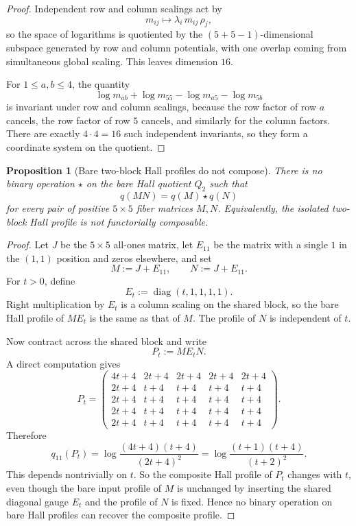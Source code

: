 \documentclass[11pt]{article}
\newtheorem{proposition}[theorem]{Proposition}
\theoremstyle{definition}
\newcommand{\diag}{\operatorname{diag}}
\newcommand{\1}{\mathbf{1}}
\begin{document}
\begin{proof}
Independent row and column scalings act by
\[
m_{ij}\longmapsto \lambda_i\,m_{ij}\,\rho_j,
\]
so the space of logarithms is quotiented by the $(5+5-1)$-dimensional subspace generated by row and column potentials, with one overlap coming from simultaneous global scaling.
This leaves dimension $16$.

For $1\le a,b\le 4$, the quantity
\[
\log m_{ab}+\log m_{55}-\log m_{a5}-\log m_{5b}
\]
is invariant under row and column scalings, because the row factor of row $a$ cancels, the row factor of row $5$ cancels, and similarly for the column factors.
There are exactly $4\cdot 4=16$ such independent invariants, so they form a coordinate system on the quotient.
\end{proof}

\begin{proposition}[Bare two-block Hall profiles do not compose]\label{prop:555-hall-noncomposition}
There is no binary operation $\star$ on the bare Hall quotient $Q_2$ such that
\[
q(MN)=q(M)\star q(N)
\]
for every pair of positive $5\times 5$ fiber matrices $M,N$.
Equivalently, the isolated two-block Hall profile is not functorially composable.
\end{proposition}

\begin{proof}
Let $J$ be the $5\times 5$ all-ones matrix, let $E_{11}$ be the matrix with a single $1$ in the $(1,1)$ position and zeros elsewhere, and set
\[
M:=J+E_{11},
\qquad
N:=J+E_{11}.
\]
For $t>0$, define
\[
E_t:=\diag(t,1,1,1,1).
\]
Right multiplication by $E_t$ is a column scaling on the shared block, so the bare Hall profile of $ME_t$ is the same as that of $M$.
The profile of $N$ is independent of $t$.

Now contract across the shared block and write
\[
P_t:=ME_tN.
\]
A direct computation gives
\[
P_t=
\begin{pmatrix}
4t+4 & 2t+4 & 2t+4 & 2t+4 & 2t+4\\
2t+4 & t+4  & t+4  & t+4  & t+4\\
2t+4 & t+4  & t+4  & t+4  & t+4\\
2t+4 & t+4  & t+4  & t+4  & t+4\\
2t+4 & t+4  & t+4  & t+4  & t+4
\end{pmatrix}.
\]
Therefore
\[
q_{11}(P_t)
=
\log\frac{(4t+4)(t+4)}{(2t+4)^2}
=
\log\frac{(t+1)(t+4)}{(t+2)^2}.
\]
This depends nontrivially on $t$.
So the composite Hall profile of $P_t$ changes with $t$, even though the bare input profile of $M$ is unchanged by inserting the shared diagonal gauge $E_t$ and the profile of $N$ is fixed.
Hence no binary operation on bare Hall profiles can recover the composite profile.
\end{proof}
\end{document}
